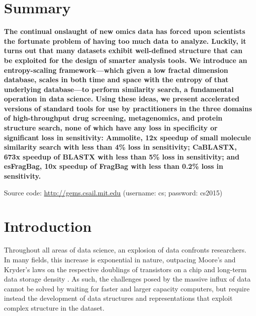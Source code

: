 \documentclass[review,preprint,12pt]{elsarticle}
\renewcommand{\cite}{\citep} %
\theoremstyle{definition}
\theoremstyle{remark}
\numberwithin{equation}{section}
\begin{document}
\section{Summary}
{ \bfseries
    The continual onslaught of new omics data has forced upon scientists the fortunate problem of having too much data to analyze.
    Luckily, it turns out that many datasets exhibit well-defined structure that can be exploited for the design of 
smarter analysis tools.
    We introduce an entropy-scaling framework---which given a low fractal dimension database, scales in both time and space with the entropy of that underlying database---to perform similarity search, a fundamental operation in data science.
    Using these ideas, we present accelerated versions of standard tools for use by practitioners in the three domains of high-throughput drug screening, metagenomics, and protein structure search, none of which have any loss in specificity or significant loss in sensitivity:
    Ammolite, 12x speedup of small molecule similarity search with less than 4\% loss in sensitivity; CaBLASTX, 673x speedup of BLASTX with less than 5\% loss in sensitivity; and esFragBag, 10x speedup of FragBag with less than 0.2\% loss in sensitivity.

    Source code: \url{http://gems.csail.mit.edu} (username: cs; password: cs2015)
}

\section{Introduction}
Throughout all areas of data science, an explosion of data confronts 
researchers.
In many fields, this increase is exponential in nature, outpacing Moore's and Kryder's laws on the respective doublings of transistors on a chip and long-term data storage density \cite{kahn2011future}.
As such, the challenges posed by the massive influx of data cannot be solved by waiting for faster and larger capacity computers, but require instead the development of data structures and representations that exploit complex
structure in the dataset.
\end{document}
